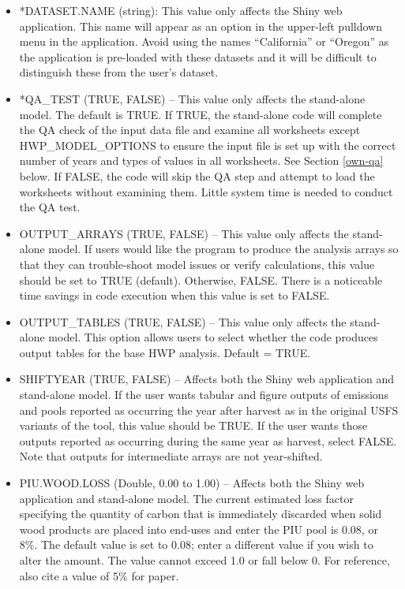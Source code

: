 \documentclass[
  openany]{book}
\begin{document}
\begin{itemize}
\item
  *DATASET.NAME (string): This value only affects the Shiny web application. This name will appear as an option in the upper-left pulldown menu in the application. Avoid using the names ``California'' or ``Oregon'' as the application is pre-loaded with these datasets and it will be difficult to distinguish these from the user's dataset.
\item
  *QA\_TEST (TRUE, FALSE) -- This value only affects the stand-alone model. The default is TRUE. If TRUE, the stand-alone code will complete the QA check of the input data file and examine all worksheets except HWP\_MODEL\_OPTIONS to ensure the input file is set up with the correct number of years and types of values in all worksheets. See Section \ref{own-qa} below. If FALSE, the code will skip the QA step and attempt to load the worksheets without examining them. Little system time is needed to conduct the QA test.
\item
  OUTPUT\_ARRAYS (TRUE, FALSE) -- This value only affects the stand-alone model. If users would like the program to produce the analysis arrays so that they can trouble-shoot model issues or verify calculations, this value should be set to TRUE (default). Otherwise, FALSE. There is a noticeable time savings in code execution when this value is set to FALSE.
\item
  OUTPUT\_TABLES (TRUE, FALSE) -- This value only affects the stand-alone model. This option allows users to select whether the code produces output tables for the base HWP analysis. Default = TRUE.
\item
  SHIFTYEAR (TRUE, FALSE) -- Affects both the Shiny web application and stand-alone model. If the user wants tabular and figure outputs of emissions and pools reported as occurring the year after harvest as in the original USFS variants of the tool, this value should be TRUE. If the user wants those outputs reported as occurring during the same year as harvest, select FALSE. Note that outputs for intermediate arrays are not year-shifted.
\item
  PIU.WOOD.LOSS (Double, 0.00 to 1.00) -- Affects both the Shiny web application and stand-alone model. The current estimated loss factor specifying the quantity of carbon that is immediately discarded when solid wood products are placed into end-uses and enter the PIU pool is 0.08, or 8\%. The default value is set to 0.08; enter a different value if you wish to alter the amount. The value cannot exceed 1.0 or fall below 0. For reference, \textcite{skog2000} also cite a value of 5\% for paper.

\end{itemize}
\end{document}
